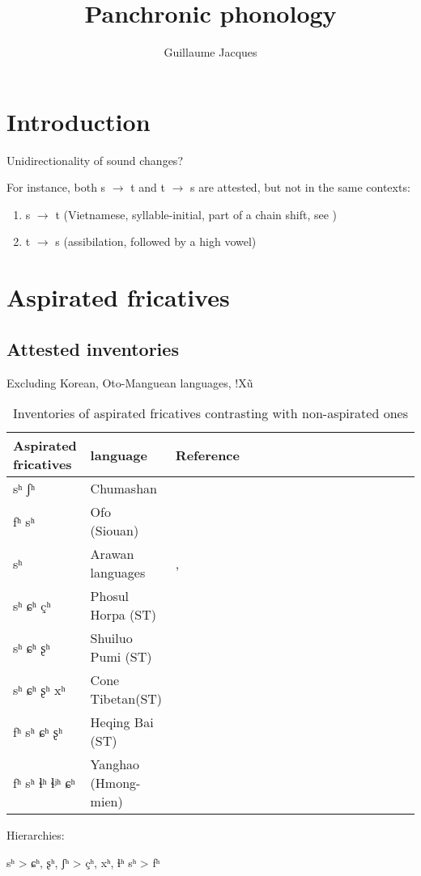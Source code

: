 \documentclass[oldfontcommands,oneside,a4paper,11pt]{article}
\begin{document}
 
\linenumbers
\title{Panchronic phonology}
\author{Guillaume Jacques}
\maketitle
\section{Introduction}
Unidirectionality of sound changes? 

For instance, both s $\rightarrow$ t and t $\rightarrow$ s are attested, but not in the same contexts:

\begin{enumerate}

\item s $\rightarrow$ t (Vietnamese, syllable-initial, part of a chain shift, see \citealt{ferlus82spirantisation})
\item t $\rightarrow$ s (assibilation, followed by a high vowel)

\end{enumerate}



\section{Aspirated fricatives}
\citet{jacques11lingua}

\subsection{Attested inventories}
 
Excluding Korean, Oto-Manguean languages, !Xũ
\begin{table}[h] \centering
\caption{Inventories of aspirated fricatives contrasting with non-aspirated ones}  
\begin{tabular}{llllllllllllllll}
\toprule
Aspirated fricatives & language & Reference\\
\midrule
sʰ ʃʰ & Chumashan &\citet{klar77chumashan}\\
fʰ sʰ& Ofo (Siouan)& \citet{reuse81ofo} \\
sʰ & Arawan languages  &\citet{dixon04arawa},
\citet{dienst05kulina}\\
sʰ ɕʰ çʰ & Phosul Horpa (ST)&\citet{jackson00puxi} \\
sʰ ɕʰ ʂʰ & Shuiluo Pumi (ST)&\citet{jacques11lingua} \\
sʰ ɕʰ ʂʰ xʰ & Cone Tibetan(ST) &\citet{jacques11lingua} \\
fʰ sʰ ɕʰ ʂʰ   & Heqing Bai (ST) &\citet{wang06songqi} \\
fʰ sʰ ɬʰ ɬʲʰ ɕʰ   & Yanghao (Hmong-mien) &\citet{ratliff10protohm}\\
\bottomrule
\end{tabular}

Hierarchies:

\begin{exe}
\ex 
\glt sʰ > {ɕʰ, ʂʰ, ʃʰ} > {çʰ, xʰ, ɬʰ}
\glt sʰ > fʰ
\end{exe}
\end{table}
\end{document}
